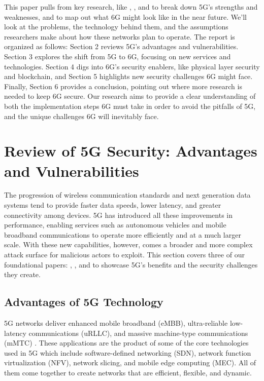 \documentclass[acmtog]{acmart}
\begin{document}
This paper pulls from key research, like \cite{ref3}, \cite{ref6}, and \cite{ref7} to break down 5G’s strengths and weaknesses, and \cite{ref4} to map out what 6G might look like in the near future. We’ll look at the problems, the technology behind them, and the assumptions researchers make about how these networks plan to operate. The report is organized as follows: Section 2 reviews 5G’s advantages and vulnerabilities. Section 3 explores the shift from 5G to 6G, focusing on new services and technologies. Section 4 digs into 6G’s security enablers, like physical layer security and blockchain, and Section 5 highlights new security challenges 6G might face. Finally, Section 6 provides a conclusion, pointing out where more research is needed to keep 6G secure. Our research aims to provide a clear understanding of both the implementation steps 6G must take in order to avoid the pitfalls of 5G, and the unique challenges 6G will inevitably face. 

\section{Review of 5G Security: Advantages and Vulnerabilities}
The progression of wireless communication standards and next generation data systems tend to provide faster data speeds, lower latency, and greater connectivity among devices. 5G has introduced all these improvements in performance, enabling services such as autonomous vehicles and mobile broadband communications to operate more efficiently and at a much larger scale. With these new capabilities, however, comes a broader and more complex attack surface for malicious actors to exploit. This section covers three of our foundational papers: \cite{ref3}, \cite{ref6}, and \cite{ref7} to showcase 5G's benefits and the security challenges they create.

\subsection{Advantages of 5G Technology}
5G networks deliver enhanced mobile broadband (eMBB), ultra-reliable low-latency communications (uRLLC), and massive machine-type communications (mMTC) \cite{ref6}. These applications are the product of some of the core technologies used in 5G which include software-defined networking (SDN), network function virtualization (NFV), network slicing, and mobile edge computing (MEC). All of them come together to create networks that are efficient, flexible, and dynamic. 
\end{document}
